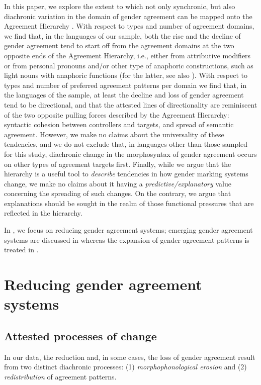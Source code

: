 \documentclass[output=collectionpaper]{langsci/langscibook}
\begin{document}
In this paper, we explore the extent to which not only synchronic, but also diachronic variation in the domain of gender agreement can be mapped onto the Agreement Hierarchy \citep[for an overview of the role of the Agreement Hierarchy in the diachrony of nominal classification see also][]{Seifart2010}.  With respect to types and number of agreement domains, we find that, in the languages of our sample, both the rise and the decline of gender agreement tend to start off from the agreement domains at the two opposite ends of the Agreement Hierarchy, i.e., either from attributive modifiers or from personal pronouns and/or other type of anaphoric constructions, such as light nouns with anaphoric functions (for the latter, see also ). With respect to types and number of preferred agreement patterns per domain we find that, in the languages of the sample, at least the decline and loss of gender agreement tend to be directional, and that the attested lines of directionality are reminiscent of the two opposite pulling forces described by the Agreement Hierarchy: syntactic cohesion between controllers and targets, and spread of semantic agreement. However, we make no claims about the universality of these tendencies, and we do not exclude that, in languages other than those sampled for this study, diachronic change in the morphosyntax of gender agreement occurs on other types of agreement targets first. Finally, while we argue that the hierarchy is a useful tool to \textit{describe} tendencies in how gender marking systems change, we make no claims about it having a \textit{predictive/explanatory} value concerning the spreading of such changes. On the contrary, we argue that explanations should be sought in the realm of those functional pressures that are reflected in the hierarchy.


In , we focus on reducing gender agreement systems; emerging gender agreement systems are discussed in  whereas the expansion of gender agreement patterns is treated in .


\section{Reducing gender agreement systems}
\label{subsec:Reducing}
\subsection{Attested processes of change}
In our data, the reduction and, in some cases, the loss of gender agreement result from two distinct diachronic processes: (1) \textit{morphophonological erosion} and (2) \textit{redistribution} of agreement patterns.
\end{document}
